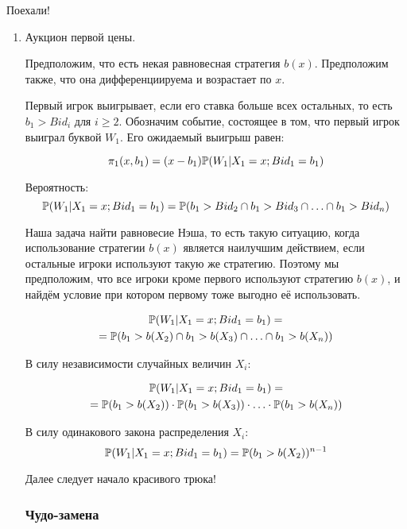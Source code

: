 Поехали!
\begin{enumerate}
\item Аукцион первой цены.

Предположим, что есть некая равновесная стратегия $ b(x) $. Предположим также, что она дифференциируема и возрастает по $x$.

Первый игрок выигрывает, если его ставка больше всех остальных, то есть $ b_{1}>Bid_{i} $ для $ i\geq 2 $. Обозначим событие, состоящее в том, что первый игрок выиграл буквой $ W_{1} $. Его ожидаемый выигрыш равен:


\begin{equation}
\label{first_price_eq}
\pi_{1}(x,b_{1})=(x-b_{1})\P(W_{1}|X_{1}=x; Bid_{1}=b_{1})
\end{equation}

Вероятность:
\begin{equation}
\P(W_{1}|X_{1}=x; Bid_{1}=b_{1})=\P(b_{1}>Bid_{2} \cap b_{1}>Bid_{3} \cap \ldots \cap b_{1}>Bid_{n})
\end{equation}


Наша задача найти равновесие Нэша, то есть такую ситуацию, когда использование стратегии $ b(x) $ является наилучшим действием, если остальные игроки используют такую же стратегию. Поэтому мы предположим, что все игроки кроме первого используют стратегию $ b(x) $, и найдём условие при котором первому тоже выгодно её использовать.

\begin{multline}
\P(W_{1}|X_{1}=x; Bid_{1}=b_{1})=\\
=\P(b_{1}>b(X_{2}) \cap b_{1}>b(X_{3}) \cap \ldots \cap b_{1}>b(X_{n}))
\end{multline}

В силу независимости случайных величин $ X_{i} $:

\begin{multline}
\P(W_{1}|X_{1}=x; Bid_{1}=b_{1})=\\
=\P(b_{1}>b(X_{2}))\cdot \P(b_{1}>b(X_{3}))\cdot \ldots\cdot \P(b_{1}>b(X_{n}))
\end{multline}

В силу одинакового закона распределения $ X_{i} $:
\begin{equation}
\P(W_{1}|X_{1}=x; Bid_{1}=b_{1})=\P(b_{1}>b(X_{2}))^{n-1}
\end{equation}



Далее следует начало красивого трюка!

\subsubsection*{Чудо-замена}


\end{enumerate}
